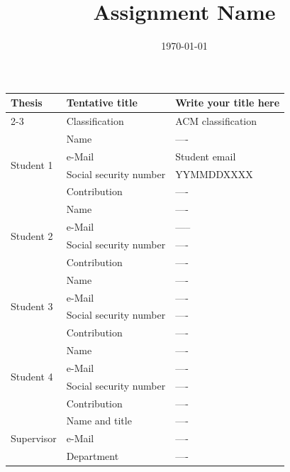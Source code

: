 \documentclass[a4paper]{article}
\title{Assignment Name}
\date{\today}
\begin{document}
\maketitle
\thispagestyle{empty}

\begin{center}
\begin{tabular}{|l|l|p{10cm}|}
\hline
\multirow{2}{*}{Thesis}   
 & Tentative title      & Write your title here \\\cline{2-3}
 & Classification       & ACM classification%
 \\\hline
\multirow{4}{*}{Student 1}
 & Name                 & ----%
 \\\cline{2-3}
 & e-Mail               & Student email \\\cline{2-3}
 & Social security number   & YYMMDDXXXX \\\cline{2-3}
 & Contribution & ---- \\
\hline
\multirow{4}{*}{Student 2}
 & Name                 & ----
 \\\cline{2-3}
 & e-Mail               & -----\\\cline{2-3}
 & Social security number   & ---- \\\cline{2-3}
 & Contribution & ---- \\
\hline
\multirow{4}{*}{Student 3}
 & Name                 & ----
 \\\cline{2-3}
 & e-Mail               & ---- \\\cline{2-3}
 & Social security number   & ---- \\\cline{2-3}
 & Contribution & ---- \\
\hline
\multirow{4}{*}{Student 4}
 & Name                 & ----
 \\\cline{2-3}
 & e-Mail               & ---- \\\cline{2-3}
 & Social security number   & ---- \\\cline{2-3}
 & Contribution & ---- \\
\hline

\multirow{3}{*}{Supervisor}
 & Name and title       & ----  \\\cline{2-3}
 & e-Mail               & ----  \\\cline{2-3}
 & Department           & ----
 \\
\hline
\end{tabular}
\end{center}

\clearpage
{}
\end{document}
